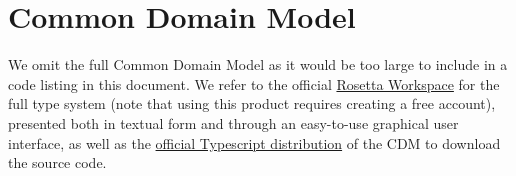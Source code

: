 \section{Common Domain Model}
\label{app:cdm}
We omit the full Common Domain Model as it would be too large to include in a code listing in this document. We refer to the official \href{https://ui.rosetta-technology.io/#/login}{Rosetta Workspace} for the full type system (note that using this product requires creating a free account), presented both in textual form and through an easy-to-use graphical user interface, as well as the \href{https://central.sonatype.com/artifact/org.finos.cdm/cdm-typescript/5.0.0-dev.14}{official Typescript distribution} of the CDM to download the source code.
